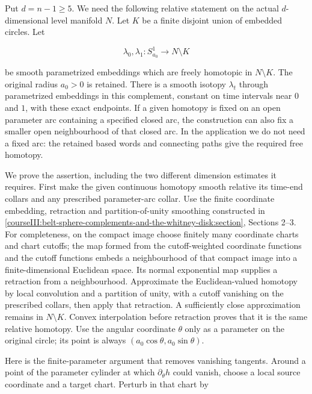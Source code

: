 Put \(d=n-1\geq5\). We need the following relative statement on the actual \(d\)-dimensional level manifold \(N\). Let \(K\) be a finite disjoint union of embedded circles. Let

\begin{equation}
\lambda_0,\lambda_1:S^1_{a_0}\longrightarrow N\setminus K
 \label{courseIII:framed-handle-slides-and-index-one-removal:eq:5.1}
\end{equation}

be smooth parametrized embeddings which are freely homotopic in \(N\setminus K\). The original radius \(a_0>0\) is retained. There is a smooth isotopy \(\lambda_t\) through parametrized embeddings in this complement, constant on time intervals near \(0\) and \(1\), with these exact endpoints. If a given homotopy is fixed on an open parameter arc containing a specified closed arc, the construction can also fix a smaller open neighbourhood of that closed arc. In the application we do not need a fixed arc: the retained based words and connecting paths give the required free homotopy.

We prove the assertion, including the two different dimension estimates it requires. First make the given continuous homotopy smooth relative its time-end collars and any prescribed parameter-arc collar. Use the finite coordinate embedding, retraction and partition-of-unity smoothing constructed in \cref{courseIII:belt-sphere-complements-and-the-whitney-disk:section}, Sections 2--3. For completeness, on the compact image choose finitely many coordinate charts and chart cutoffs; the map formed from the cutoff-weighted coordinate functions and the cutoff functions embeds a neighbourhood of that compact image into a finite-dimensional Euclidean space. Its normal exponential map supplies a retraction from a neighbourhood. Approximate the Euclidean-valued homotopy by local convolution and a partition of unity, with a cutoff vanishing on the prescribed collars, then apply that retraction. A sufficiently close approximation remains in \(N\setminus K\). Convex interpolation before retraction proves that it is the same relative homotopy. Use the angular coordinate \(\theta\) only as a parameter on the original circle; its point is always \((a_0\cos\theta,a_0\sin\theta)\).

Here is the finite-parameter argument that removes vanishing tangents. Around a point of the parameter cylinder at which \(\partial_\theta h\) could vanish, choose a local source coordinate and a target chart. Perturb in that chart by

